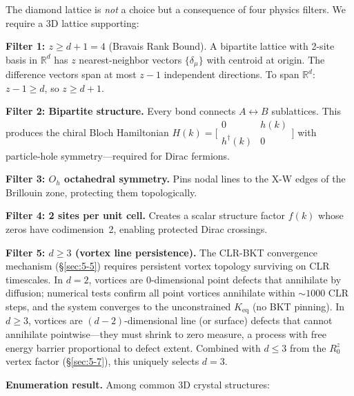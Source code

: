 \documentclass[aps,prd,onecolumn,superscriptaddress,floatfix,12pt]{revtex4-2}
\newcommand{\Rzero}{R_0}
\begin{document}
The diamond lattice is \emph{not} a choice but a consequence of four physics filters. We require a 3D lattice supporting:

\textbf{Filter 1: $z \geq d + 1 = 4$} (Bravais Rank Bound). A bipartite lattice with 2-site basis in $\mathbb{R}^d$ has $z$ nearest-neighbor vectors $\{\delta_\mu\}$ with centroid at origin. The difference vectors span at most $z - 1$ independent directions. To span $\mathbb{R}^d$: $z - 1 \geq d$, so $z \geq d + 1$.

\textbf{Filter 2: Bipartite structure.} Every bond connects $A \leftrightarrow B$ sublattices. This produces the chiral Bloch Hamiltonian $H(k) = \bigl[\begin{smallmatrix} 0 & h(k) \\ h^\dagger(k) & 0 \end{smallmatrix}\bigr]$ with particle-hole symmetry---required for Dirac fermions.

\textbf{Filter 3: $O_h$ octahedral symmetry.} Pins nodal lines to the X-W edges of the Brillouin zone, protecting them topologically.

\textbf{Filter 4: 2 sites per unit cell.} Creates a scalar structure factor $f(k)$ whose zeros have codimension~2, enabling protected Dirac crossings.

\textbf{Filter 5: $d \geq 3$ (vortex line persistence).} The CLR-BKT convergence mechanism (\S\ref{sec:5-5}) requires persistent vortex topology surviving on CLR timescales. In $d = 2$, vortices are 0-dimensional point defects that annihilate by diffusion; numerical tests confirm all point vortices annihilate within $\sim\!1000$ CLR steps, and the system converges to the unconstrained $K_{\text{eq}}$ (no BKT pinning). In $d \geq 3$, vortices are $(d{-}2)$-dimensional line (or surface) defects that cannot annihilate pointwise---they must shrink to zero measure, a process with free energy barrier proportional to defect extent. Combined with $d \leq 3$ from the $\Rzero^z$ vertex factor (\S\ref{sec:5-7}), this uniquely selects $d = 3$.

\textbf{Enumeration result.} Among common 3D crystal structures:
\end{document}
